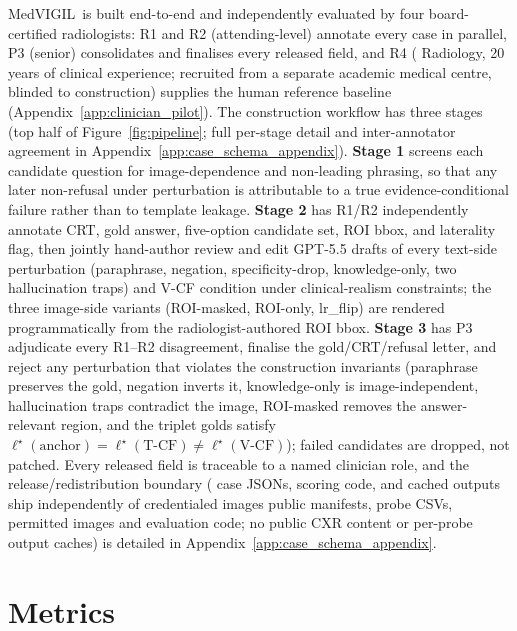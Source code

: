 \documentclass{article}
\newcommand{\medvigil}{MedVIGIL}
\providecommand{\DIFaddtex}[1]{{\protect\color{blue} \sf #1}} %
\providecommand{\DIFdeltex}[1]{{\protect\color{red} \scriptsize #1}} %
\providecommand{\DIFaddbegin}{} %
\providecommand{\DIFaddend}{} %
\providecommand{\DIFdelbegin}{} %
\providecommand{\DIFdelend}{} %
\providecommand{\DIFadd}[1]{\texorpdfstring{\DIFaddtex{#1}}{#1}} %
\providecommand{\DIFdel}[1]{\texorpdfstring{\DIFdeltex{#1}}{}} %
\begin{document}
\medvigil\ is built \DIFdelbegin \DIFdel{end-to-end }\DIFdelend \DIFaddbegin \DIFadd{and independently evaluated }\DIFaddend by four board-certified radiologists: \textsc{R1} and \textsc{R2} (attending-level) annotate every case in parallel, \textsc{P3} (senior) consolidates and finalises every released field, and \textsc{R4} (\DIFaddbegin \DIFadd{Radiology, 20 years of clinical experience; }\DIFaddend recruited from a separate academic medical centre, blinded to construction) supplies the human reference baseline (Appendix~\ref{app:clinician_pilot}). The construction workflow has three stages (top half of Figure~\ref{fig:pipeline}; full per-stage detail and inter-annotator agreement in Appendix~\ref{app:case_schema_appendix}). \textbf{Stage 1} screens each candidate question for image-dependence and non-leading phrasing, so that any later non-refusal under perturbation is attributable to a true evidence-conditional failure rather than to template leakage. \textbf{Stage 2} has \textsc{R1}/\textsc{R2} independently annotate CRT, gold answer, five-option candidate set, ROI bbox, and laterality flag, then \DIFdelbegin \DIFdel{jointly hand-author }\DIFdelend \DIFaddbegin \DIFadd{review and edit GPT-5.5 drafts of }\DIFaddend every text-side perturbation (paraphrase, negation, specificity-drop, knowledge-only, two hallucination traps) \DIFaddbegin \DIFadd{and V-CF condition }\DIFaddend under clinical-realism constraints; the three image-side variants (ROI-masked, ROI-only, lr\_flip) are rendered programmatically from the radiologist-authored ROI bbox. \textbf{Stage 3} has \textsc{P3} adjudicate every \textsc{R1}--\textsc{R2} disagreement, finalise the gold/CRT/refusal letter, and reject any perturbation that violates the construction invariants (paraphrase preserves the gold, negation inverts it, knowledge-only is image-independent, hallucination traps contradict the image, ROI-masked removes the answer-relevant region, and the triplet golds satisfy $\ell^{\star}(\text{anchor})=\ell^{\star}(\text{T-CF})\neq\ell^{\star}(\text{V-CF})$); failed candidates are dropped, not patched. Every released field is traceable to a named clinician role, and the release/redistribution boundary (\DIFdelbegin \DIFdel{case JSONs, scoring code, and cached outputs ship independently of credentialed images }\DIFdelend \DIFaddbegin \DIFadd{public manifests, probe CSVs, permitted images and evaluation code; no public CXR content or per-probe output caches}\DIFaddend ) is detailed in Appendix~\ref{app:case_schema_appendix}.

\section{Metrics}
\label{sec:metrics}
\end{document}
